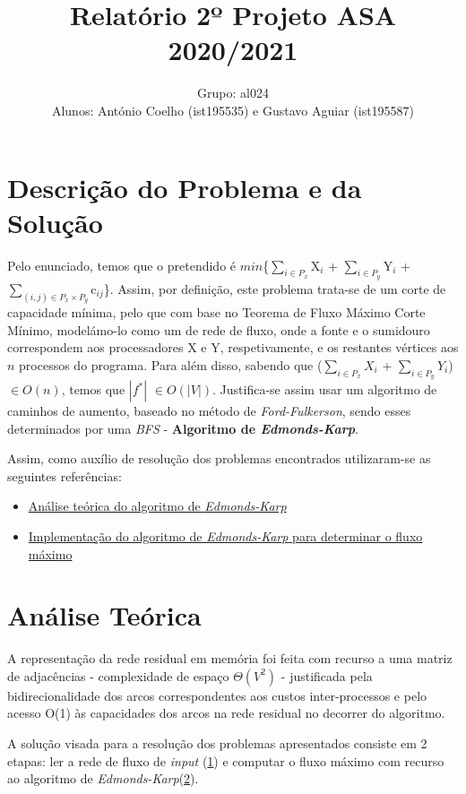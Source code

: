 \documentclass[12pt]{article}
\author{
	Grupo: al024\\Alunos: António Coelho (ist195535) e Gustavo Aguiar (ist195587)
}
\title{\vspace{-2cm}Relatório 2º Projeto ASA 2020/2021}
\date{}
\begin{document}
\maketitle
\section{Descrição do Problema e da Solução}
Pelo enunciado, temos que o pretendido é $min$\{$\sum_{i\in{P_{x}}}$X$_{i}$ + $\sum_{i\in{P_{y}}}$Y$_{i}$ + $\sum_{(i, j)\in{P_{x} \times P_{y}}}$c$_{ij}$\}. Assim, por definição, este problema trata-se de um corte de capacidade mínima, pelo que com base no Teorema de Fluxo Máximo Corte Mínimo, modelámo-lo como um de rede de fluxo, onde a fonte e o sumidouro correspondem aos processadores X e Y, respetivamente, e os restantes vértices aos $n$ processos do programa.
Para além disso, sabendo que ($\sum_{i\in{P_{x}}}$$X_{i}$ + $\sum_{i\in{P_{y}}}$$Y_{i}$) $\in{O(n)}$, temos que $\left|f^{*}\right|$ $\in{O(\left|V\right|)}$. Justifica-se assim usar um algoritmo de caminhos de aumento, baseado no método de \emph{Ford-Fulkerson}, sendo esses determinados por uma \emph{BFS} - \textbf{Algoritmo de \emph{Edmonds-Karp}}.

Assim, como auxílio de resolução dos problemas encontrados utilizaram-se as seguintes referências:
\begin{itemize}
\item\href{https://brilliant.org/wiki/edmonds-karp-algorithm/}{Análise teórica do algoritmo de \emph{Edmonds-Karp}}
\item\href{https://www.geeksforgeeks.org/ford-fulkerson-algorithm-for-maximum-flow-problem/}{Implementação do algoritmo de \emph{Edmonds-Karp} para determinar o fluxo máximo}
\end{itemize}
 
 \section{Análise Teórica}
 A representação da rede residual em memória foi feita com recurso a uma matriz de adjacências - complexidade de espaço $\Theta{(V^2)}$ - justificada pela bidirecionalidade dos arcos correspondentes aos custos inter-processos e pelo acesso O(1) às capacidades dos arcos na rede residual no decorrer do algoritmo.

A solução visada para a resolução dos problemas apresentados consiste em 2 etapas: ler a rede de fluxo de \emph{input} (\underline{1}) e computar o fluxo máximo com recurso ao algoritmo de \emph{Edmonds-Karp}(\underline{2}).
\end{document}
